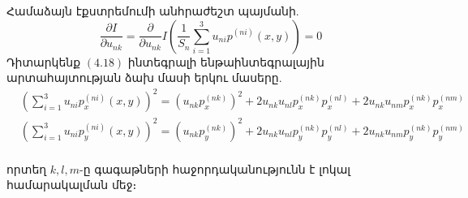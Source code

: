 \documentclass[fleqn, bachelor,subf,12pt,notitlepage]{article}
\begin{document}
Համաձայն էքստրեմումի անհրաժեշտ պայմանի.
\begin{equation}
\dfrac{\partial I}{ \partial u_{nk}} = \dfrac{\partial}{\partial u_{nk}} I \left(\dfrac{1}{S_{n}}\sum_{i=1}^{3}u_{ni}p^{(ni)}(x,y)\right) = 0
\end{equation}
Դիտարկենք $\left(4.18\right)$ ինտեգրալի ենթաինտեգրալային արտահայտության ձախ մասի երկու մասերը.
\begin{equation}
\begin{aligned}
&\left(\sum_{i=1}^{3}u_{ni}p^{(ni)}_{x}(x,y)\right)^2=\left(u_{nk}p_{x}^{(nk)}\right)^{2}+2u_{nk}u_{nl}p_{x}^{(nk)}p_{x}^{(nl)}+2u_{nk}u_{nm}p_{x}^{(nk)}p_{x}^{(nm)} \\
&\left(\sum_{i=1}^{3}u_{ni}p^{(ni)}_{y}(x,y)\right)^2=\left(u_{nk}p_{y}^{(nk)}\right)^{2}+2u_{nk}u_{nl}p_{y}^{(nk)}p_{y}^{(nl)}+2u_{nk}u_{nm}p_{y}^{(nk)}p_{y}^{(nm)} \\
\end{aligned}
\end{equation}

\noindent որտեղ $k, l, m$-ը գագաթների հաջորդականությունն է լոկալ համարակալման մեջ։
\end{document}
